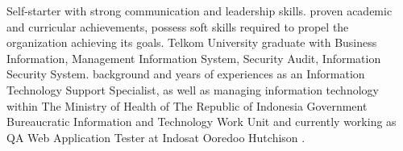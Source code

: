 
\par{
Self-starter with strong communication and leadership skills. proven academic and curricular achievements, possess soft skills required to propel the organization achieving its goals. Telkom University graduate with Business Information, Management Information System, Security Audit, Information Security System. background and years of experiences as an Information Technology Support Specialist, as well as managing information technology within The Ministry of Health of The Republic of Indonesia Government Bureaucratic Information and Technology Work Unit and currently working as QA Web Application Tester at Indosat Ooredoo Hutchison .
}
